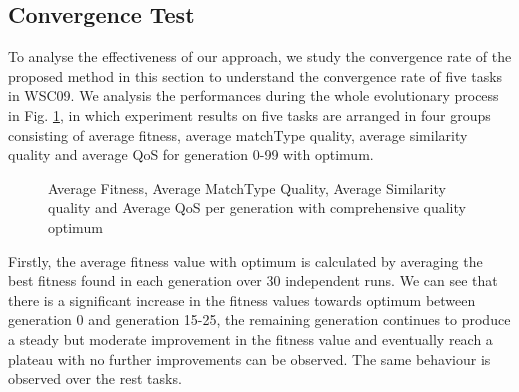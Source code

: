\documentclass{llncs}
\begin{document}
\subsection{Convergence Test}\label{convergenceTest}
To analyse the effectiveness of our approach, we study the convergence rate of the proposed method in this section to understand the convergence rate of five tasks in WSC09. We analysis the performances during the whole evolutionary process in Fig. \ref{exp_fitnessvalue}, in which experiment results on five tasks are arranged in four groups consisting of average fitness, average matchType quality, average similarity quality and average QoS for generation 0-99 with optimum.

\begin{figure}[h]
 \caption{Average Fitness, Average MatchType Quality, Average Similarity quality and Average QoS per generation with comprehensive quality optimum}
 \label{exp_fitnessvalue}
\end{figure}
\vspace{-0.5cm}

Firstly, the average fitness value with optimum is calculated by averaging the best fitness found in each generation over 30 independent runs. We can see that there is a significant increase in the fitness values towards optimum between generation 0 and generation 15-25, the remaining generation continues to produce a steady but moderate improvement in the fitness value and eventually reach a plateau with no further improvements can be observed. The same behaviour is observed over the rest tasks.
\end{document}
